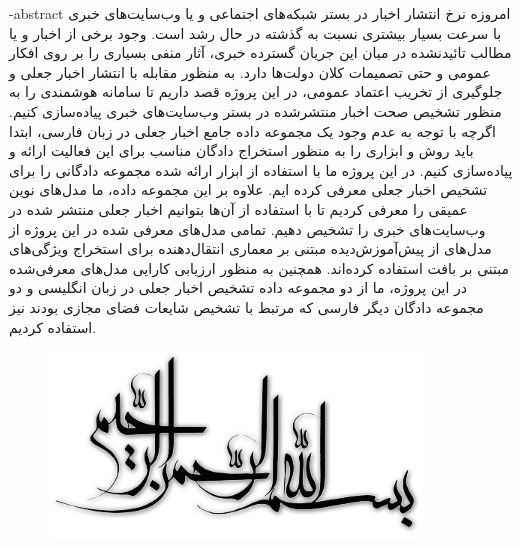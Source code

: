 
\fa-abstract{
امروزه نرخ انتشار اخبار در بستر شبکه‌های اجتماعی و یا وب‌سایت‌های خبری با سرعت بسیار بیشتری نسبت به گذشته در حال رشد است. وجود برخی از اخبار و یا مطالب تائیدنشده در میان این جریان گسترده خبری، آثار منفی بسیاری را بر روی افکار عمومی و حتی تصمیمات کلان دولت‌ها دارد. به منظور مقابله با انتشار اخبار جعلی و جلوگیری از تخریب اعتماد عمومی، در این پروژه قصد داریم تا سامانه‌ هوشمندی را به منظور تشخیص صحت اخبار منتشرشده  در بستر وب‌سایت‌های خبری پیاده‌سازی کنیم. اگرچه با توجه به عدم وجود یک مجموعه داده جامع اخبار جعلی در زبان فارسی، ابتدا باید روش و ابزاری را به منظور استخراج دادگان مناسب برای این فعالیت ارائه و پیاده‌سازی کنیم. در این پروژه ما با استفاده از ابزار ارائه شده مجموعه دادگانی را برای تشخیص اخبار جعلی معرفی کرده ایم. علاوه بر این مجموعه داده، ما مدل‌های نوین عمیقی را معرفی کردیم تا با استفاده از آن‌ها بتوانیم اخبار جعلی منتشر شده در وب‌سایت‌های خبری را تشخیص دهیم. تمامی مدل‌های معرفی شده در این پروژه از مدل‌های از پیش‌آموزش‌دیده مبتنی بر معماری انتقال‌دهنده‌ برای استخراج ویژگی‌های مبتنی بر بافت استفاده کرده‌اند. همچنین به منظور ارزیابی کارایی مدل‌های معرفی‌شده در این پروژه، ما از دو مجموعه داده تشخیص اخبار جعلی در زبان انگلیسی و دو مجموعه دادگان دیگر فارسی که مرتبط با تشخیص شایعات فضای مجازی بودند نیز استفاده کردیم.
}





\AUTtitle
\vspace*{7cm}
\thispagestyle{empty}
\begin{center}
\includegraphics[height=5cm,width=12cm]{besm}
\end{center}